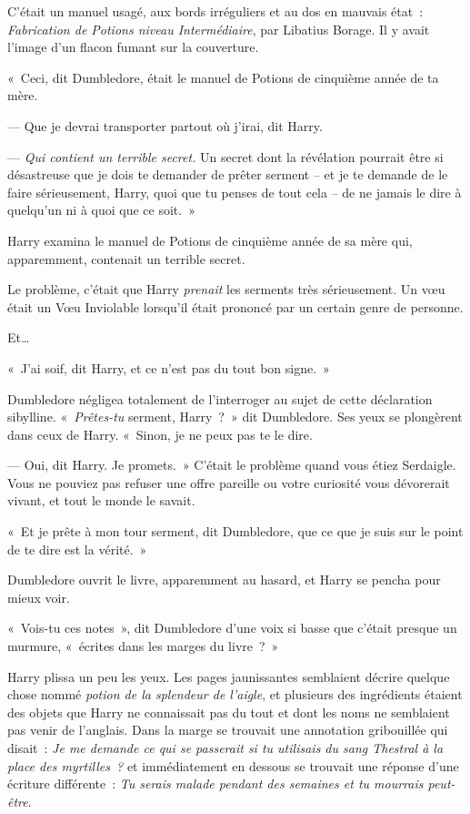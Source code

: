 C'était un manuel usagé, aux bords irréguliers et au dos en mauvais état~: \emph{Fabrication de Potions niveau Intermédiaire}, par Libatius Borage. Il y avait l'image d'un flacon fumant sur la couverture.

«~Ceci, dit Dumbledore, était le manuel de Potions de cinquième année de ta mère.

--- Que je devrai transporter partout où j'irai, dit Harry.

--- \emph{Qui contient un terrible secret.} Un secret dont la révélation pourrait être si désastreuse que je dois te demander de prêter serment -- et je te demande de le faire sérieusement, Harry, quoi que tu penses de tout cela -- de ne jamais le dire à quelqu'un ni à quoi que ce soit.~»

Harry examina le manuel de Potions de cinquième année de sa mère qui, apparemment, contenait un terrible secret.

Le problème, c'était que Harry \emph{prenait} les serments très sérieusement. Un vœu était un Vœu Inviolable lorsqu'il était prononcé par un certain genre de personne.

Et…

«~J'ai soif, dit Harry, et ce n'est pas du tout bon signe.~»

Dumbledore négligea totalement de l'interroger au sujet de cette déclaration sibylline. «~\emph{Prêtes-tu} serment, Harry~?~» dit Dumbledore. Ses yeux se plongèrent dans ceux de Harry. «~Sinon, je ne peux pas te le dire.

--- Oui, dit Harry. Je promets.~» C'était le problème quand vous étiez Serdaigle. Vous ne pouviez pas refuser une offre pareille ou votre curiosité vous dévorerait vivant, et tout le monde le savait.

«~Et je prête à mon tour serment, dit Dumbledore, que ce que je suis sur le point de te dire est la vérité.~»

Dumbledore ouvrit le livre, apparemment au hasard, et Harry se pencha pour mieux voir.

«~Vois-tu ces notes~», dit Dumbledore d'une voix si basse que c'était presque un murmure, «~écrites dans les marges du livre~?~»

Harry plissa un peu les yeux. Les pages jaunissantes semblaient décrire quelque chose nommé \emph{potion de la splendeur de l'aigle}, et plusieurs des ingrédients étaient des objets que Harry ne connaissait pas du tout et dont les noms ne semblaient pas venir de l'anglais. Dans la marge se trouvait une annotation gribouillée qui disait~: \emph{Je me demande ce qui se passerait si tu utilisais du sang Thestral à la place des myrtilles~?} et immédiatement en dessous se trouvait une réponse d'une écriture différente~: \emph{Tu serais malade pendant des semaines et tu mourrais peut-être}.

